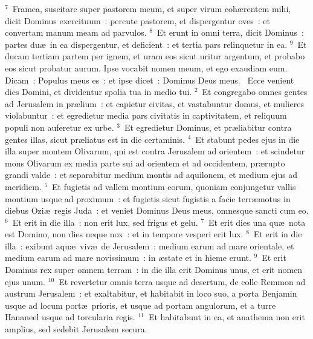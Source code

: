 ${}^{7}$~Framea, suscitare super pastorem meum, et super virum coh\ae rentem mihi, dicit Dominus exercituum~: percute pastorem, et dispergentur oves~: et convertam manum meam ad parvulos.
${}^{8}$~Et erunt in omni terra, dicit Dominus~: partes du\ae\ in ea dispergentur, et deficient~: et tertia pars relinquetur in ea.
${}^{9}$~Et ducam tertiam partem per ignem, et uram eos sicut uritur argentum, et probabo eos sicut probatur aurum. Ipse vocabit nomen meum, et ego exaudiam eum. Dicam~: Populus meus es~: et ipse dicet~: Dominus Deus meus.
~\lettrine[lines=10,image=true,loversize=0.05,lraise=-0.03]{E}{}cce venient dies Domini, et dividentur spolia tua in medio tui.
${}^{2}$~Et congregabo omnes gentes ad Jerusalem in pr\ae lium~: et capietur civitas, et vastabuntur domus, et mulieres violabuntur~: et egredietur media pars civitatis in captivitatem, et reliquum populi non auferetur ex urbe.
${}^{3}$~Et egredietur Dominus, et pr\ae liabitur contra gentes illas, sicut pr\ae liatus est in die certaminis.
${}^{4}$~Et stabunt pedes ejus in die illa super montem Olivarum, qui est contra Jerusalem ad orientem~: et scindetur mons Olivarum ex media parte sui ad orientem et ad occidentem, pr\ae rupto grandi valde~: et separabitur medium montis ad aquilonem, et medium ejus ad meridiem.
${}^{5}$~Et fugietis ad vallem montium eorum, quoniam conjungetur vallis montium usque ad proximum~: et fugietis sicut fugistis a facie terr\ae motus in diebus Ozi\ae\ regis Juda~: et veniet Dominus Deus meus, omnesque sancti cum eo.
${}^{6}$~Et erit in die illa~: non erit lux, sed frigus et gelu.
${}^{7}$~Et erit dies una qu\ae\ nota est Domino, non dies neque nox~: et in tempore vesperi erit lux.
${}^{8}$~Et erit in die illa~: exibunt aqu\ae\ viv\ae\ de Jerusalem~: medium earum ad mare orientale, et medium earum ad mare novissimum~: in \ae state et in hieme erunt.
${}^{9}$~Et erit Dominus rex super omnem terram~: in die illa erit Dominus unus, et erit nomen ejus unum.
${}^{10}$~Et revertetur omnis terra usque ad desertum, de colle Remmon ad austrum Jerusalem~: et exaltabitur, et habitabit in loco suo, a porta Benjamin usque ad locum port\ae\ prioris, et usque ad portam angulorum, et a turre Hananeel usque ad torcularia regis.
${}^{11}$~Et habitabunt in ea, et anathema non erit amplius, sed sedebit Jerusalem secura.


